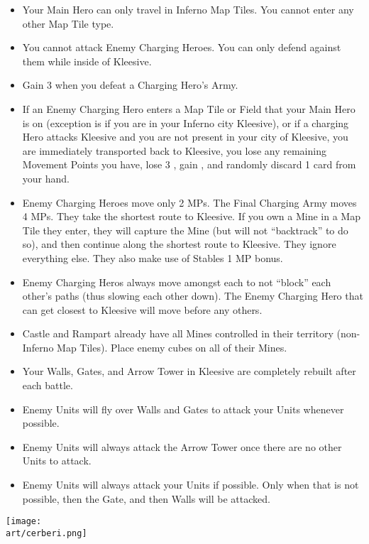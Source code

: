 \begin{multicols*}{2}
\begin{itemize}
  \item Your Main Hero can only travel in Inferno Map Tiles. You cannot enter any other Map Tile type.
  \item You cannot attack Enemy Charging Heroes. You can only defend against them while inside of Kleesive.
  \item Gain 3  when you defeat a Charging Hero's Army.
  \item If an Enemy Charging Hero enters a Map Tile or Field that your Main Hero is on (exception is if you are in
    your Inferno city Kleesive), or if a charging Hero attacks Kleesive and you are not present in your city
    of Kleesive, you are immediately transported back to Kleesive, you lose any remaining Movement Points
    you have, lose 3 , gain , and randomly discard 1 card from your hand.
  \item Enemy Charging Heroes move only 2 MPs. The Final Charging Army moves 4 MPs. They take the shortest
    route to Kleesive. If you own a Mine in a Map Tile they enter, they will capture the Mine (but will not
    ``backtrack'' to do so), and then continue along the shortest route to Kleesive. They ignore everything
    else. They also make use of Stables 1 MP bonus.
  \item Enemy Charging Heros always move amongst each to not ``block'' each other's paths (thus slowing each
    other down). The Enemy Charging Hero that can get closest to Kleesive will move before any others.
  \item Castle and Rampart already have all Mines controlled in their territory (non-Inferno Map Tiles). Place enemy
    cubes on all of their Mines.
  \item Your Walls, Gates, and Arrow Tower in Kleesive are completely rebuilt after each battle.
  \item Enemy  Units will fly over Walls and Gates to attack your Units whenever possible.
  \item Enemy  Units will always attack the Arrow Tower once there are no other  Units to attack.
  \item Enemy Units will always attack your Units if possible. Only when that is not possible, then the Gate,
    and then Walls will be attacked.
\end{itemize}

\vspace*{\fill}
\texttt{[image: \\art/cerberi.png]}
\vspace*{\fill}

\end{multicols*}

